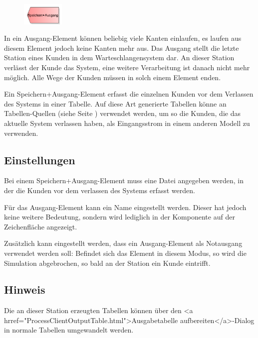 \begin{figure}
\vspace{-22pt}
\includegraphics[width=2cm]{imageModelElementDisposeWithTable.png}
\vspace{-22pt}
\end{figure}

In ein Ausgang-Element können beliebig viele Kanten einlaufen, es laufen aus diesem Element jedoch keine Kanten mehr aus.
Das Ausgang stellt die letzte Station eines Kunden in dem Warteschlangensystem dar. An dieser Station verlässt der Kunde
das System, eine weitere Verarbeitung ist danach nicht mehr möglich. Alle Wege der Kunden müssen in solch einem Element enden.

Ein Speichern+Ausgang-Element erfasst die einzelnen Kunden vor dem Verlassen des Systems in einer Tabelle. Auf diese Art
generierte Tabellen könne an Tabellen-Quellen (siehe Seite \pageref{ref:ModelElementSourceTable}) verwendet werden, um so die
Kunden, die das aktuelle System verlassen haben, als Eingangsstrom in einem anderen Modell zu verwenden.

\subsection*{Einstellungen}

Bei einem Speichern+Ausgang-Element muss eine Datei angegeben werden, in der die Kunden vor dem verlassen des Systems erfasst werden.

Für das Ausgang-Element kann ein Name eingestellt werden. Dieser hat jedoch keine weitere Bedeutung, sondern wird lediglich
in der Komponente auf der Zeichenfläche angezeigt.

Zusätzlich kann eingestellt werden, dass ein Ausgang-Element als Notausgang verwendet werden soll: Befindet sich das Element
in diesem Modus, so wird die Simulation abgebrochen, so bald an der Station ein Kunde eintrifft.

\subsection*{Hinweis}

Die an dieser Station erzeugten Tabellen können über den <a hrref="ProcessClientOutputTable.html">Ausgabetabelle aufbereiten</a>-Dialog
in normale Tabellen umgewandelt werden.


